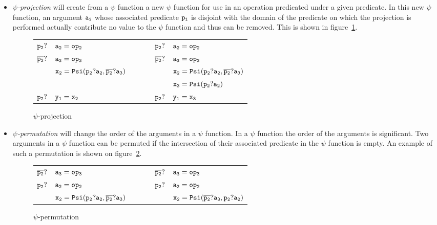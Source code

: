 \begin{itemize}
\item{\emph{$\psi$-projection}} will create from a $\psi$ function a
  new $\psi$ function for use in an operation predicated under a given
  predicate. In this new $\psi$ function, an argument ${\tt a_i}$
  whose associated predicate ${\tt p_i}$ is disjoint with the domain
  of the predicate on which the projection is performed actually
  contribute no value to the $\psi$ function and thus can be
  removed. This is shown in figure~\ref{fig:psi_projection}.

\begin{figure}
\begin{center}
\footnotesize
\begin{tabular}{lllll}
${\tt p_2?}$ & ${\tt a_2 = op_2}$             & \ \ \ \  & ${\tt p_2?}$ & ${\tt a_2 = op_2}$ \\
${\tt \overline{p_2}?}$ & ${\tt a_3 = op_3}$              & \ \ \ \  & ${\tt \overline{p_2}?}$ & ${\tt a_3 = op_3}$ \\
             & ${\tt x_2 = Psi(p_2?a_2, \overline{p_2}?a_3)}$ & \ \ \ \  &              &${\tt x_2 = Psi(p_2?a_2, \overline{p_2}?a_3)}$ \\
             &                               & \ \ \ \  &              & ${\tt x_3 = Psi(p_2?a_2)}$ \\
${\tt p_2?}$ & ${\tt y_1 = x_2}$              & \ \ \ \  & ${\tt p_2?}$ & ${\tt y_1 = x_3}$ \\
\end{tabular}
\caption{$\psi$-projection}
\label{fig:psi_projection}
\end{center}
\end{figure}

\item{\emph{$\psi$-permutation}} will change the order of the
  arguments in a $\psi$ function. In a $\psi$ function the order of
  the arguments is significant. Two arguments in a $\psi$ function can
  be permuted if the intersection of their associated predicate in the
  $\psi$ function is empty. An example of such a permutation is shown
  on figure~\ref{fig:psi_permutation}.

\begin{figure}
\begin{center}
\footnotesize
\begin{tabular}{lllll}
${\tt \overline{p_2}?}$ & ${\tt a_3 = op_3}$              & \ \ \ \  & ${\tt \overline{p_2}?}$ & ${\tt a_3 = op_3}$ \\
${\tt p_2?}$ & ${\tt a_2 = op_2}$             & \ \ \ \  & ${\tt p_2?}$ & ${\tt a_2 = op_2}$ \\
             & ${\tt x_2 = Psi(p_2?a_2, \overline{p_2}?a_3)}$ & \ \ \ \  &              &${\tt x_2 = Psi(\overline{p_2}?a_3, p_2?a_2)}$ \\
\end{tabular}
\caption{$\psi$-permutation}
\label{fig:psi_permutation}
\end{center}
\end{figure}


\end{itemize}
